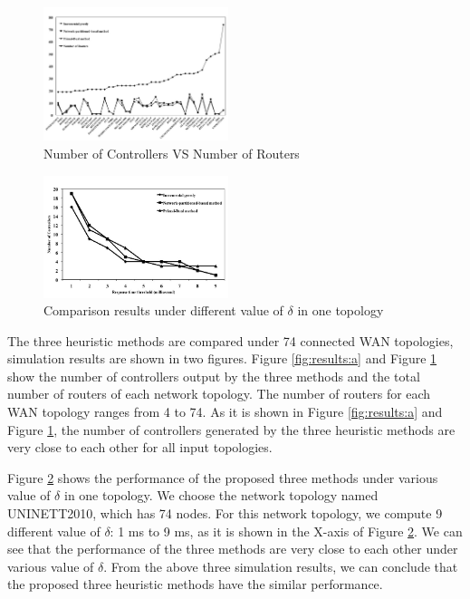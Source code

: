 \documentclass[conference]{IEEEtran}
\begin{document}
\begin{figure}[!htbp]
\center
\includegraphics[width=0.48\textwidth]{fig/second.jpg}
\caption{Number of Controllers VS Number of Routers}
\label{fig:results:b}
\end{figure}

\begin{figure}[!htbp]
\center
\includegraphics[width=0.48\textwidth]{fig/bound.jpg}
\caption{Comparison results under different value of $\delta$ in one topology}
\label{fig:results:c}
\end{figure}


The three heuristic methods are compared under 74 connected WAN topologies, simulation results are shown in two figures. Figure \ref{fig:results:a} and Figure \ref{fig:results:b} show the number of controllers output by the three methods and the total number of routers of each network topology. The number of routers for each WAN topology ranges from 4 to 74. As it is shown in Figure \ref{fig:results:a} and Figure \ref{fig:results:b}, the number of controllers generated by the three heuristic methods are very close to each other for all input topologies.  

Figure \ref{fig:results:c} shows the performance of the proposed three methods under various value of $\delta$ in one topology. We choose the network topology named UNINETT2010, which has 74 nodes. For this network topology, we compute 9 different value of $\delta$: 1 ms to 9 ms, as it is shown in the X-axis of Figure \ref{fig:results:c}. We can see that the performance of the three methods are very close to each other under various value of $\delta$. From the above three simulation results, we can conclude that the proposed three heuristic methods have the similar performance.
\end{document}
